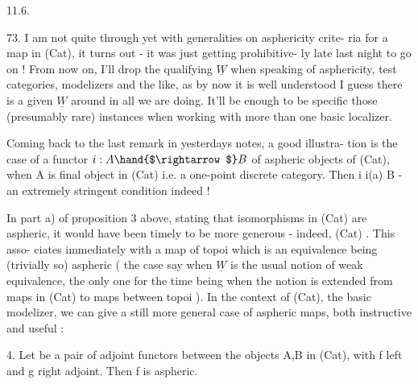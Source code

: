 
11.6.

73. I am not quite through yet with generalities on asphericity crite-%
ria for a map in (Cat), it turns out - it was just getting prohibitive-%
ly late last night to go on ! \margin{\P} From now on, I'll drop the qualifying
$\underline{W}$ when speaking of asphericity, test categories, modelizers and the
like, as by now it is well understood I guess there is a given $\underline{W}$ around
in all we are doing. It'll be enough to be specific  those (presumably
rare) instances when working with more than one basic localizer.

Coming back to the last remark in yesterdays notes, a good illustra-%
tion is the case of a functor $i : A \hand{$\rightarrow$} B$ of aspheric objects of (Cat),
when A is  final  object in (Cat) i.e. a one-point discrete
category. Then i \hand{\uline{\textcolor{black}{is aspheric iff}}} i(a) \hand{\uline{\textcolor{black}{is an initial object of}}} B - an
extremely stringent  condition indeed !

In part a) of proposition 3 above, stating that isomorphisms in
(Cat) are aspheric, it would have been timely to be more generous -
indeed, \hand{\uline{\textcolor{black}{any equivalence of categories in}}} (Cat) \hand{\uline{\textcolor{black}{is aspheric}}}. This asso-%
ciates immediately with a map of topoi which is an equivalence being
(trivially so) aspheric ( the case\hand{,} say\hand{,} when $\underline{W}$ is the usual notion of
weak equivalence, the only one for the time being when the notion is
extended from maps in (Cat) to maps between topoi ). In the context of
(Cat), the basic modelizer, we can give a still more general case of
aspheric maps, both instructive and useful :

\hand{\uline{\textcolor{black}{Proposition}}} 4. Let
be a pair of adjoint functors between the objects A,B in (Cat), with f
left and g right adjoint. Then f is aspheric.

